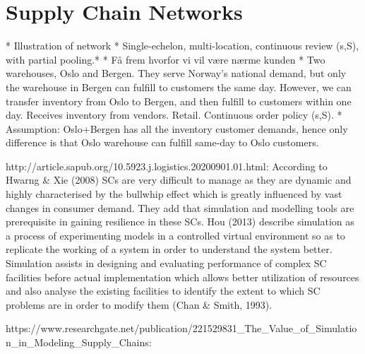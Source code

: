\documentclass[../../main.tex]{subfiles}
\begin{document}

\section{Supply Chain Networks}

*	Illustration of network
*	Single-echelon, multi-location, continuous review (s,S), with partial pooling.*
*	Få frem hvorfor vi vil være nærme kunden
*	Two warehouses, Oslo and Bergen. They serve Norway’s national demand, but only the warehouse in Bergen can fulfill to customers the same day. However, we can transfer inventory from Oslo to Bergen, and then fulfill to customers within one day. Receives inventory from vendors. Retail. Continuous order policy (s,S). 
*	Assumption: Oslo+Bergen has all the inventory customer demands, hence only difference is that Oslo warehouse can fulfill same-day to Oslo customers.

http://article.sapub.org/10.5923.j.logistics.20200901.01.html:
According to Hwarng & Xie (2008) SCs are very difficult to manage as they are dynamic and highly characterised by the bullwhip effect which is greatly influenced by vast changes in consumer demand. They add that simulation and modelling tools are prerequisite in gaining resilience in these SCs. Hou (2013) describe simulation as a process of experimenting models in a controlled virtual environment so as to replicate the working of a system in order to understand the system better. Simulation assists in designing and evaluating performance of complex SC facilities before actual implementation which allows better utilization of resources and also analyse the existing facilities to identify the extent to which SC problems are in order to modify them (Chan & Smith, 1993).

https://www.researchgate.net/publication/221529831_The_Value_of_Simulation_in_Modeling_Supply_Chains:



\end{document}
